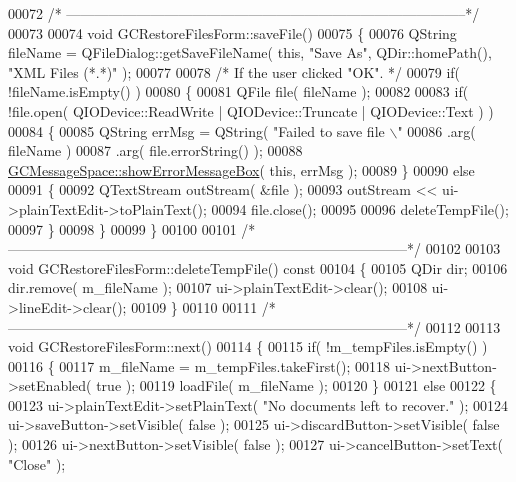 \begin{DoxyCode}
00072 \textcolor{comment}{/*
      --------------------------------------------------------------------------------------*/}
00073 
00074 \textcolor{keywordtype}{void} GCRestoreFilesForm::saveFile()
00075 \{
00076   QString fileName = QFileDialog::getSaveFileName( \textcolor{keyword}{this}, \textcolor{stringliteral}{"Save As"}, 
      QDir::homePath(), \textcolor{stringliteral}{"XML Files (*.*)"} );
00077 
00078   \textcolor{comment}{/* If the user clicked "OK". */}
00079   \textcolor{keywordflow}{if}( !fileName.isEmpty() )
00080   \{
00081     QFile file( fileName );
00082 
00083     \textcolor{keywordflow}{if}( !file.open( QIODevice::ReadWrite | QIODevice::Truncate | 
      QIODevice::Text ) )
00084     \{
00085       QString errMsg = QString( \textcolor{stringliteral}{"Failed to save file \(\backslash\)"%
00086                        .arg( fileName )
00087                        .arg( file.errorString() );
00088       \hyperlink{namespace_g_c_message_space_ab118b3a133686167617eb955029fd44e}{GCMessageSpace::showErrorMessageBox}( \textcolor{keyword}{this}, errMsg );
00089     \}
00090     \textcolor{keywordflow}{else}
00091     \{
00092       QTextStream outStream( &file );
00093       outStream << ui->plainTextEdit->toPlainText();
00094       file.close();
00095 
00096       deleteTempFile();
00097     \}
00098   \}
00099 \}
00100 
00101 \textcolor{comment}{/*
      --------------------------------------------------------------------------------------*/}
00102 
00103 \textcolor{keywordtype}{void} GCRestoreFilesForm::deleteTempFile()\textcolor{keyword}{ const}
00104 \textcolor{keyword}{}\{
00105   QDir dir;
00106   dir.remove( m\_fileName );
00107   ui->plainTextEdit->clear();
00108   ui->lineEdit->clear();
00109 \}
00110 
00111 \textcolor{comment}{/*
      --------------------------------------------------------------------------------------*/}
00112 
00113 \textcolor{keywordtype}{void} GCRestoreFilesForm::next()
00114 \{
00115   \textcolor{keywordflow}{if}( !m\_tempFiles.isEmpty() )
00116   \{
00117     m\_fileName = m\_tempFiles.takeFirst();
00118     ui->nextButton->setEnabled( \textcolor{keyword}{true} );
00119     loadFile( m\_fileName );
00120   \}
00121   \textcolor{keywordflow}{else}
00122   \{
00123     ui->plainTextEdit->setPlainText( \textcolor{stringliteral}{"No documents left to recover."} );
00124     ui->saveButton->setVisible( \textcolor{keyword}{false} );
00125     ui->discardButton->setVisible( \textcolor{keyword}{false} );
00126     ui->nextButton->setVisible( \textcolor{keyword}{false} );
00127     ui->cancelButton->setText( \textcolor{stringliteral}{"Close"} );
}
\end{DoxyCode}
